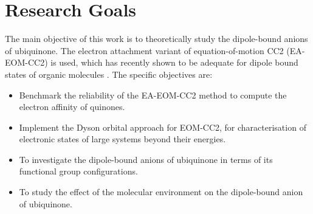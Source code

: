\section{Research Goals}
The main objective of this work is to theoretically study the dipole-bound anions of ubiquinone. The electron attachment variant of equation-of-motion CC2 (EA-EOM-CC2) is used, which has recently shown to be adequate for dipole bound states of organic molecules \cite{paran2024performance}. The specific objectives are:
\begin{itemize}
  \item Benchmark the reliability of the EA-EOM-CC2 method to compute the electron affinity of quinones.
  \item Implement the Dyson orbital approach for EOM-CC2, for characterisation of electronic states of large systems beyond their energies.
  \item To investigate the dipole-bound anions of ubiquinone in terms of its functional group configurations.
  \item To study the effect of the molecular environment on the dipole-bound anion of ubiquinone.
\end{itemize}

\cleardoublepage

